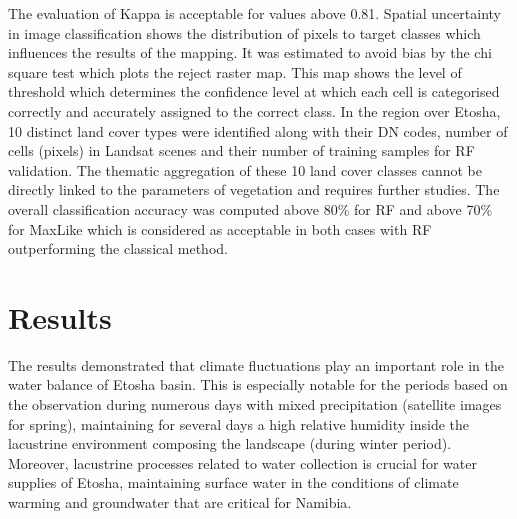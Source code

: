 \documentclass[climate,article,submit,pdftex,moreauthors]{Definitions/mdpi}
\begin{document}
{The evaluation of Kappa is acceptable for values above 0.81. Spatial uncertainty in image classification shows the distribution of pixels to target classes which influences the results of the mapping. It was estimated to avoid bias by the chi square test which plots the reject raster map. This map shows the level of threshold which determines the confidence level at which each cell is categorised correctly and accurately assigned to the correct class. In the region over Etosha, 10 distinct land cover types were identified along with their DN codes, number of cells (pixels) in Landsat scenes and their number of training samples for RF validation. The thematic aggregation of these 10 land cover classes cannot be directly linked to the parameters of vegetation and requires further studies. The overall classification accuracy was computed above 80\% for RF and above 70\% for MaxLike which is considered as acceptable in both cases with RF outperforming the classical method.}


\section{Results}

{The results demonstrated that climate fluctuations play an important role in the water balance of Etosha basin. This is especially notable for the periods based on the observation during numerous days with mixed precipitation (satellite images for spring), maintaining for several days a high relative humidity inside the lacustrine environment composing the landscape (during winter period). Moreover, lacustrine processes related to water collection is crucial for water supplies of Etosha, maintaining surface water in the conditions of climate warming and groundwater that are critical for Namibia.} 
\end{document}
